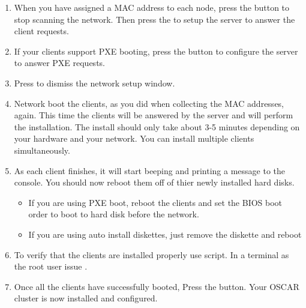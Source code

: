 \begin {enumerate}

\item When you have assigned a MAC address to each node, press the
   button to stop scanning the network. Then
  press the  to setup the server to
  answer the client requests.


\item If your clients support PXE booting, press the  button to configure the server to answer PXE
  requests.


\item Press  to dismiss the network setup window.
  
\item Network boot the clients, as you did when collecting the MAC
  addresses, again. This time the clients will be answered by the
  server and will perform the installation. The install should only
  take about 3-5 minutes depending on your hardware and your network.
  You can install multiple clients simultaneously.


\item As each client finishes, it will start beeping and printing a
  message to the console. You should now reboot them off of thier
  newly installed hard disks.

  \begin{itemize}
  \item If you are using PXE boot, reboot the clients and set the BIOS
    boot order to boot to hard disk before the network.
  \item If you are using auto install diskettes, just remove the
    diskette and reboot
  \end{itemize}

  
\item To verify that the clients are installed properly use
   script.  In a terminal as the root user issue
  .

  
\item Once all the clients have successfully booted, Press the
   button. Your OSCAR cluster is now
  installed and configured.


\end{enumerate}
